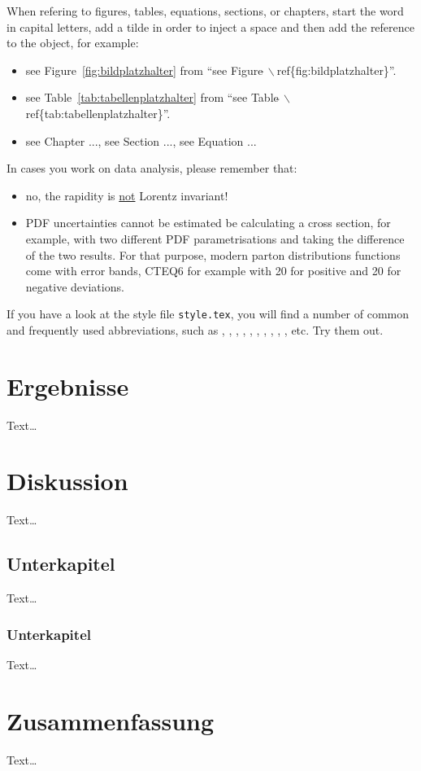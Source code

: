 \documentclass[bachelor,       %
               twoside,        %
               BCOR10mm,       %
               ngerman,english  %
               ]{GAUBM}
\begin{document}
When refering to figures, tables, equations, sections, or chapters,
start the word in capital letters, add a tilde in order to inject a
space and then add the reference to the object, for example:
\begin{itemize}
  \item see Figure~\ref{fig:bildplatzhalter} from ``see
    Figure$\tilde{\ }\backslash$ref\{fig:bildplatzhalter\}''.
  \item see Table~\ref{tab:tabellenplatzhalter} from ``see
    Table$\tilde{\ }\backslash$ref\{tab:tabellenplatzhalter\}''.
  \item see Chapter ..., see Section ..., see Equation ...
\end{itemize}

In cases you work on data analysis, please remember that:
\begin{itemize}
\item no, the rapidity is {\underline{not}} Lorentz invariant!
\item PDF uncertainties cannot be estimated be calculating a cross
  section, for example, with two different PDF parametrisations and
  taking the difference of the two results. For that purpose, modern
  parton distributions functions come with error bands, CTEQ6 for
  example with 20 for positive and 20 for negative deviations.
\end{itemize}

If you have a look at the style file {\tt style.tex}, you will find a
number of common and frequently used abbreviations, such as \dzero,
\cdf, \ttbar, \ljets, \mujets, \tevatron, \cern, \pythia, \herwig, \geant, \met
etc. Try them out.


\chapter{Ergebnisse}
Text\dots
\chapter{Diskussion}
Text\dots
\section{Unterkapitel}
Text\dots
\subsection{Unterkapitel}
Text\dots
\chapter{Zusammenfassung}
Text\dots
\end{document}
